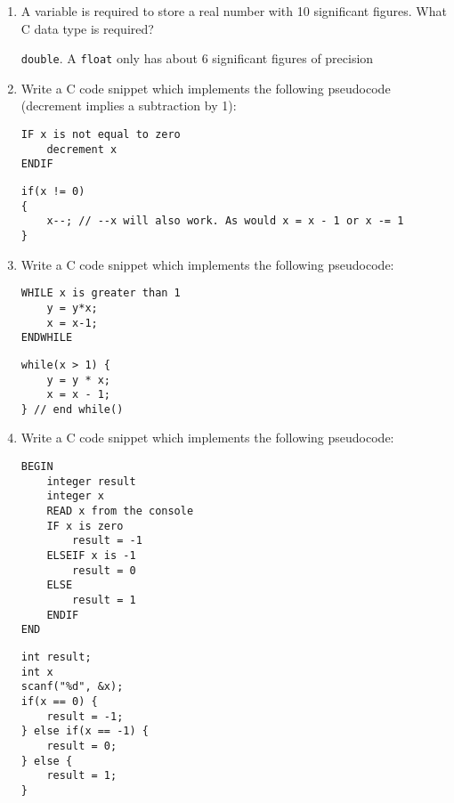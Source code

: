 \documentclass{lab}
\begin{document}
\begin{enumerate}
\item A variable is required to store a real number with 10 significant figures. What C data type is required?

\texttt{double}. A \texttt{float} only has about 6 significant figures of precision

\item Write a C code snippet which implements the following pseudocode (decrement implies a subtraction by 1):
\begin{lstlisting}[style=pseudo]
IF x is not equal to zero
	decrement x
ENDIF
\end{lstlisting}

\begin{lstlisting}[style=CStyle]
if(x != 0)
{
	x--; // --x will also work. As would x = x - 1 or x -= 1
}
 \end{lstlisting}
 
\item Write a C code snippet which implements the following pseudocode:
\begin{lstlisting}[style=pseudo]
WHILE x is greater than 1
	y = y*x;
	x = x-1;
ENDWHILE
\end{lstlisting}

\begin{lstlisting}[style=CStyle]
while(x > 1) {
	y = y * x;
	x = x - 1;
} // end while()
\end{lstlisting}

\item Write a C code snippet which implements the following pseudocode:
\begin{lstlisting}[style=pseudo]
BEGIN
	integer result
	integer x
	READ x from the console
	IF x is zero
		result = -1
	ELSEIF x is -1
		result = 0
	ELSE
		result = 1
	ENDIF
END
\end{lstlisting}
\begin{lstlisting}[style=CStyle]
int result;
int x
scanf("%d", &x);
if(x == 0) {
	result = -1;
} else if(x == -1) {
	result = 0;
} else {
	result = 1;
}
\end{lstlisting}

\end{enumerate}
\end{document}
